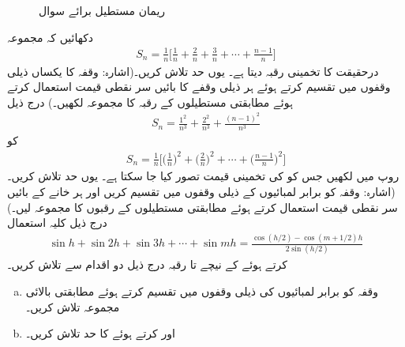 \begin{figure}
\begin{minipage}{0.45\textwidth}
\caption{ریمان مستطیل برائے سوال }
\label{شکل_سوال_تکمل_ریمان_مجموعہ_مربع}
\end{minipage}
\end{figure}
دکھائیں کہ مجموعہ
\begin{align*}
S_n=\frac{1}{n}\big[\frac{1}{n}+\frac{2}{n}+\frac{3}{n}+\cdots+\frac{n-1}{n}\big]
\end{align*}
درحقیقت  کا تخمینی رقبہ دیتا ہے۔ یوں حد  تلاش کریں۔(اشارہ: وقفہ  کا یکساں  ذیلی وقفوں میں تقسیم کرتے ہوئے ہر ذیلی وقفے کا بائیں سر نقطی قیمت استعمال کرتے ہوئے مطابقتی مستطیلوں کے رقبہ کا مجموعہ لکھیں۔)
درج ذیل
\begin{align*}
S_n=\frac{1^2}{n^3}+\frac{2^2}{n^3}+\frac{(n-1)^2}{n^3}
\end{align*}
کو
\begin{align*}
S_n=\frac{1}{n}\big[\big(\frac{1}{n})^2+\big(\frac{2}{n}\big)^2+\cdots+\big(\frac{n-1}{n}\big)^2\big]
\end{align*}
روپ میں لکھیں جس کو  کی تخمینی قیمت تصور کیا جا سکتا ہے۔ یوں حد  تلاش کریں۔ (اشارہ: وقفہ  کو  برابر لمبائیوں کے ذیلی وقفوں میں تقسیم کریں اور ہر خانے کے بائیں سر نقطی قیمت استعمال کرتے ہوئے مطابقتی مستطیلوں کے رقبوں کا مجموعہ لیں۔)
درج ذیل کلیہ استعمال 
\begin{align*}
\sin h+\sin 2h+\sin 3h+\cdots+\sin mh=\frac{\cos(h/2)-\cos(m+1/2)h}{2\sin(h/2)}
\end{align*}
کرتے ہوئے  کے نیچے  تا  رقبہ درج ذیل دو اقدام سے تلاش کریں۔
\begin{enumerate}[a.]
\item
وقفہ  کو  برابر لمبائیوں کی ذیلی وقفوں میں تقسیم کرتے ہوئے مطابقتی بالائی مجموعہ  تلاش کریں۔
\item
{} اور  کرتے ہوئے  کا حد تلاش کریں۔
\end{enumerate}
